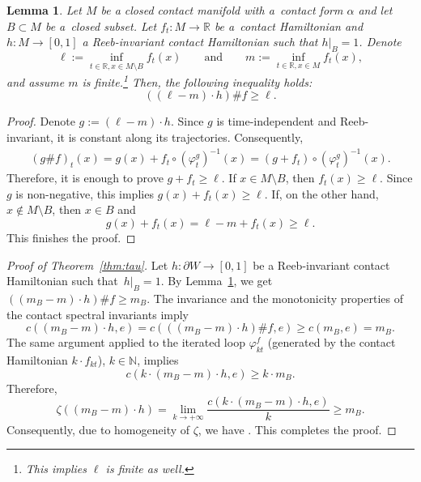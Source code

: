 \documentclass[10pt,a4paper]{amsart}
\numberwithin{equation}{section}
\newtheorem{Lemma}[Theorem]{Lemma}
\theoremstyle{definition}
\begin{document}
{
\begin{Lemma}\label{lem:aut}
Let $M$ be a closed contact manifold with a~contact form $\alpha$ and let $B\subset M$ be a~closed subset. Let $f_t\colon M\to\mathbb{R}$ be a~contact Hamiltonian and $h\colon M\to[0,1]$ a Reeb-invariant contact Hamiltonian such that $ h |_B=1$. Denote
\[\ell:=\inf_{t\in \mathbb{R}, x\in M\setminus B} f_t(x)\qquad \text{and} \qquad
m:=\inf_{t\in \mathbb{R}, x\in M} f_t(x),\]
and assume $m$ is finite.\footnote{This implies $\ell$ is finite as well.} Then, the following inequality holds:
\[ ((\ell-m)\cdot h)\# f\geqslant \ell. \]
\end{Lemma}}
\begin{proof}
Denote $g:=(\ell-m)\cdot h$. Since $g$ is time-independent and Reeb-invariant, it is constant along its trajectories. Consequently,
\begin{align*}
(g\# f)_t(x) = g(x) + f_t\circ (\varphi^{g}_t )^{-1}(x) = (g + f_t)\circ (\varphi^{g}_t )^{-1}(x).
\end{align*}
Therefore, it is enough to prove $g+f_t\geqslant \ell$. If $x\in {M\setminus B}$, then $f_t(x)\geqslant \ell$. Since $g$ is non-negative, this implies $g(x)+ f_t(x)\geqslant \ell$. If, on the other hand, $x\not \in {M\setminus B}$, then $x\in B$ and
\[ g(x) + f_t(x)= \ell-m + f_t(x)\geqslant \ell. \]
This finishes the proof.
\end{proof}

\begin{proof}[Proof of Theorem~\ref{thm:tau}]
Let $h\colon\partial W\to[0,1]$ be a Reeb-invariant contact Hamiltonian such that~${ h |_B=1}$. By Lemma~\ref{lem:aut}, we get $ ((m_B-m)\cdot h )\#f\geqslant m_B$. The {invariance} and the monotonicity properties of the contact spectral invariants imply
\[c((m_B-m)\cdot h, e)= c ( ((m_B-m)\cdot h )\#f, e )\geqslant c(m_B, e)=m_B.\]
The same argument applied to the iterated loop $\varphi^f_{kt}$ (generated by the contact Hamiltonian ${k\cdot f_{kt}}$), $k\in\mathbb{N}$, implies
\[c(k\cdot(m_B-m)\cdot h, e)\geqslant k\cdot m_B.\]
Therefore,
\[\zeta((m_B-m)\cdot h)= \lim_{k\to+\infty} \frac{c(k\cdot(m_B-m)\cdot h, e)}{k}\geqslant m_B. \]
Consequently, due to homogeneity of $\zeta$, we have . This completes the proof.
\end{proof}
\end{document}
